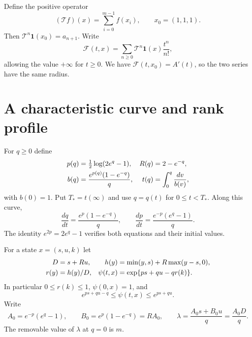 \documentclass[11pt,letterpaper]{article}
\theoremstyle{remark}
\newcommand{\TT}{\mathcal T}
\newcommand{\one}{\mathbf 1}
\begin{document}
Define the positive operator
\[
 (\TT f)(x)=\sum_{i=0}^{m-1}f(x_i),\qquad x_0=(1,1,1).
\]
Then $\TT^n\one(x_0)=a_{n+1}$. Write
\begin{equation}\label{a58:fd:eq:F}
 \mathcal F(t,x)=\sum_{n\ge0}\TT^n\one(x)\frac{t^n}{n!},
\end{equation}
allowing the value $+\infty$ for $t\ge0$. We have $\mathcal F(t,x_0)=A'(t)$, so the two series have the same radius.

\section{A characteristic curve and rank profile}
For $q\ge0$ define
\begin{align}\label{a58:fd:eq:parameters}
 p(q)&=\tfrac12\log(2e^q-1),& R(q)&=2-e^{-q},\notag\\
 b(q)&=\frac{e^{p(q)}(1-e^{-q})}{q},&
 t(q)&=\int_0^q\frac{dv}{b(v)},
\end{align}
with $b(0)=1$. Put $T_*=t(\infty)$ and use $q=q(t)$ for $0\le t<T_*$. Along this curve,
\begin{equation}\label{a58:fd:eq:flow}
 \frac{dq}{dt}=\frac{e^p(1-e^{-q})}{q},\qquad
 \frac{dp}{dt}=\frac{e^{-p}(e^q-1)}{q}.
\end{equation}
The identity $e^{2p}=2e^q-1$ verifies both equations and their initial values.

For a state $x=(s,u,k)$ let
\begin{align}\label{a58:fd:eq:profile}
 D&=s+Ru,& h(y)&=\min(y,s)+R\max(y-s,0),\notag\\
 r(y)&=h(y)/D,&
 \psi(t,x)&=\exp\{ps+qu-qr(k)\}.
\end{align}
In particular $0\le r(k)\le1$, $\psi(0,x)=1$, and
\begin{equation}\label{a58:fd:eq:psibounds}
 e^{ps+qu-q}\le\psi(t,x)\le e^{ps+qu}.
\end{equation}
Write
\[
 A_0=e^{-p}(e^q-1),\qquad B_0=e^p(1-e^{-q})=RA_0,
 \qquad \lambda=\frac{A_0s+B_0u}{q}=\frac{A_0D}{q}.
\]
The removable value of $\lambda$ at $q=0$ is $m$.
\end{document}
